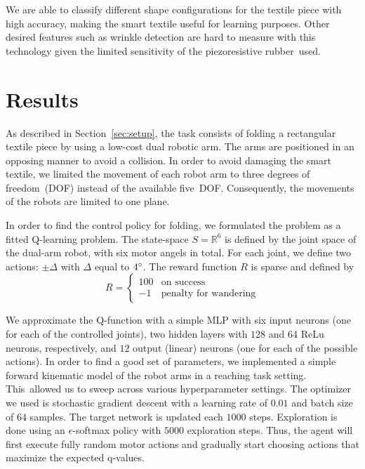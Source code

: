\documentclass[applsci,article,accept,moreauthors,pdftex]{Definitions/mdpi}
\begin{document}
We are able to classify different shape configurations for the textile piece with high accuracy, making the smart textile useful for learning purposes. Other desired features such as wrinkle detection are hard to measure with this technology given the limited sensitivity of the piezoresistive rubber~used.


\section{Results}
\label{sec:results}

As described in Section~\ref{sec:setup}, the task consists of folding a rectangular textile piece by using a low-cost dual robotic arm. The arms are positioned in an opposing manner to avoid a collision. In order to avoid damaging the smart textile, we limited the movement of each robot arm to three degrees of freedom~(DOF) instead of the available five~DOF. Consequently, the movements of the robots are limited to one plane.

In order to find the control policy for folding, we formulated the problem as a fitted Q-learning problem. The state-space $S=\mathbb{R}^6$ is defined by the joint space of the dual-arm robot, with six motor angels in total. For each joint, we define two actions: $\pm \Delta$ with $\Delta$ equal to $4 \degree$. The reward function $R$ is sparse and defined by
\begin{equation*}
R=
\begin{cases}
100 & \text{on success} \\
-1  & \text{penalty for wandering}
\end{cases}
\end{equation*}

We approximate the Q-function with a simple MLP with six input neurons (one for each of the controlled joints), two hidden layers with  $128$ and $64$ ReLu neurons, respectively, and $12$ output (linear) neurons (one for each of the possible actions). In order to find a good set of parameters, we implemented a simple forward kinematic model of the robot arms in a reaching task setting. This~allowed us to sweep across various hyperparameter settings. The optimizer we used is stochastic gradient descent with a learning rate of $0.01$ and batch size of $64$ samples. The target network is updated each $1000$ steps. Exploration is done using an $\epsilon$-softmax policy with $5000$ exploration steps. Thus, the agent will first execute fully random motor actions and gradually start choosing actions that maximize the expected q-values.
\end{document}
